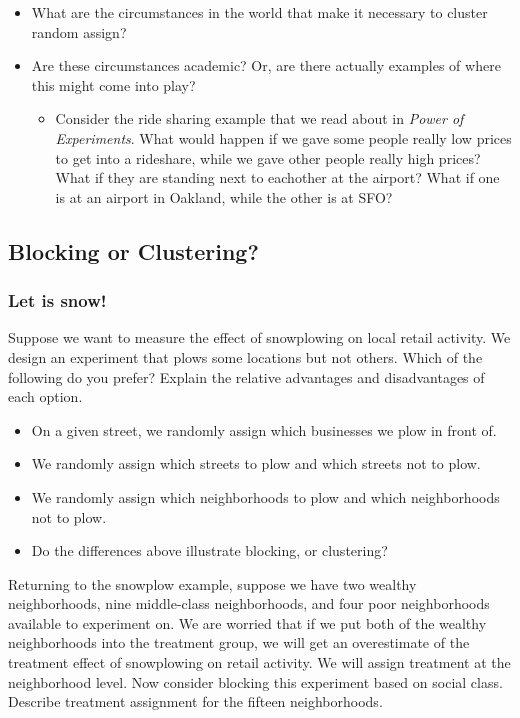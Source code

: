 \documentclass[
]{article}
\providecommand{\tightlist}{%
  \setlength{\itemsep}{0pt}\setlength{\parskip}{0pt}}
\theoremstyle{definition}
\theoremstyle{definition}
\theoremstyle{definition}
\theoremstyle{definition}
\theoremstyle{remark}
\begin{document}
\begin{itemize}
\tightlist
\item
  What are the circumstances in the world that make it necessary to cluster random assign?
\item
  Are these circumstances academic? Or, are there actually examples of where this might come into play?

  \begin{itemize}
  \tightlist
  \item
    Consider the ride sharing example that we read about in \emph{Power of Experiments}. What would happen if we gave some people really low prices to get into a rideshare, while we gave other people really high prices? What if they are standing next to eachother at the airport? What if one is at an airport in Oakland, while the other is at SFO?
  \end{itemize}
\end{itemize}

\subsection{Blocking or Clustering?}\label{blocking-or-clustering}

\subsubsection{Let is snow!}\label{let-is-snow}

Suppose we want to measure the effect of snowplowing on local retail activity. We design an experiment that plows some locations but not others. Which of the following do you prefer? Explain the relative advantages and disadvantages of each option.

\begin{itemize}
\tightlist
\item
  On a given street, we randomly assign which businesses we plow in front of.
\item
  We randomly assign which streets to plow and which streets not to plow.
\item
  We randomly assign which neighborhoods to plow and which neighborhoods not to plow.
\item
  Do the differences above illustrate blocking, or clustering?
\end{itemize}

Returning to the snowplow example, suppose we have two wealthy neighborhoods, nine middle-class neighborhoods, and four poor neighborhoods available to experiment on. We are worried that if we put both of the wealthy neighborhoods into the treatment group, we will get an overestimate of the treatment effect of snowplowing on retail activity.
We will assign treatment at the neighborhood level. Now consider blocking this experiment based on social class. Describe treatment assignment for the fifteen neighborhoods.
\end{document}
